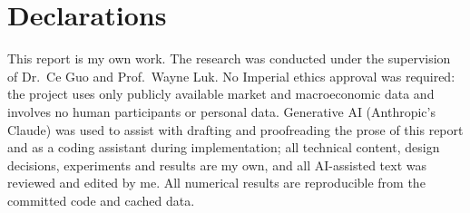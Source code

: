 \documentclass[12pt, a4paper]{report}
\begin{document}
\clearpage
\printbibliography[heading=bibintoc, title={References}]

\chapter*{Declarations}
This report is my own work. The research was conducted under the supervision of
Dr.\ Ce Guo and Prof.\ Wayne Luk. No Imperial ethics approval was required: the
project uses only publicly available market and macroeconomic data and involves
no human participants or personal data. Generative AI (Anthropic's Claude) was
used to assist with drafting and proofreading the prose of this report and as a
coding assistant during implementation; all technical content, design decisions,
experiments and results are my own, and all AI-assisted text was reviewed and
edited by me. All numerical results are reproducible from the committed code and
cached data.

\appendix

\end{document}
